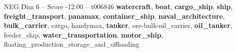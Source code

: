 \begin{textsample}{NEG Dim 6 – Score -12.00 – t006846}  \label{ex:f6_neg_005}
\textbf{watercraft}, \textbf{boat}, \textbf{cargo\_ship}, \textbf{ship}, \textbf{freight\_transport}, \textbf{panamax}, \textbf{container\_ship}, \textbf{naval\_architecture}, \textbf{bulk\_carrier}, cargo, handymax, \textbf{tanker}, ore-bulk-oil\_carrier, \textbf{oil\_tanker}, feeder\_ship, \textbf{water\_transportation}, \textbf{motor\_ship}, floating\_production\_storage\_and\_offloading

\end{textsample}

